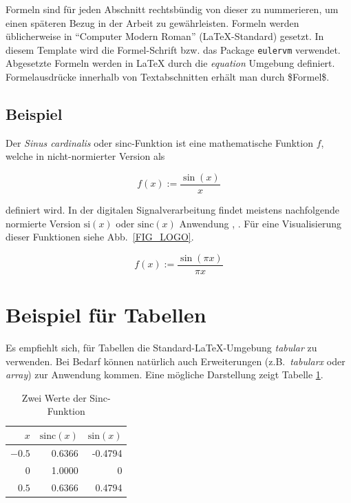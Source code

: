 Formeln sind für jeden Abschnitt rechtsbündig von dieser zu nummerieren, um einen späteren Bezug in der Arbeit zu gewährleisten. Formeln werden üblicherweise in "`Computer Modern Roman"' (\LaTeX{}-Standard) gesetzt. In diesem Template wird die Formel-Schrift bzw. das Package \texttt{eulervm} verwendet. Abgesetzte Formeln werden in \LaTeX{} durch die 
\emph{equation} Umgebung definiert. Formelausdrücke innerhalb von Textabschnitten erhält man durch \$Formel\$.

\subsection*{Beispiel}
%
Der \emph{Sinus cardinalis} oder sinc-Funktion ist eine mathematische Funktion $f$, welche in nicht-normierter Version als

\begin{equation}
	f(x) := \frac{\sin(x)}{x}
	\label{eq:bsp}
\end{equation}

definiert wird. In der digitalen Signalverarbeitung findet meistens nachfolgende normierte Version $\mathrm{si}(x)$ oder $\mathrm{sinc}(x)$ Anwendung \cite{x1}, \cite{x2}. Für eine Visualisierung dieser Funktionen siehe Abb.~\ref{FIG_LOGO}.

\begin{equation}
	f(x) := \frac{\sin(\pi x)}{\pi x}
	\label{EQ_SAMPLE}
\end{equation}

\section{Beispiel für Tabellen}
%
Es empfiehlt sich, für Tabellen die Standard-\LaTeX{}-Umgebung \emph{tabular} zu verwenden. Bei Bedarf können natürlich auch Erweiterungen (z.B.~\emph{tabularx} oder \emph{array}) zur Anwendung kommen. Eine mögliche Darstellung zeigt Tabelle \ref{Table_Sinc}.

\begin{table}[h!]%
	\begin{center}
		\begin{tabular}{|r|r|r|}
			\firsthline
			$x$&$\mathrm{sinc}(x)$&$\mathrm{sin}(x)$\\\hline\hline
			$-0.5$&0.6366&-0.4794\\\hline
			$0$&1.0000&0\\\hline
			$0.5$&0.6366&0.4794\\\hline
		\end{tabular}
		\caption{Zwei Werte der Sinc-Funktion}
		\label{Table_Sinc}
	\end{center}
\end{table}








